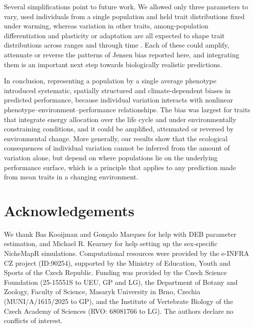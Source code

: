 \documentclass[12pt]{article}
\begin{document}
Several simplifications point to future work. We allowed only three parameters to vary, used individuals from a single population and held trait distributions fixed under warming, whereas variation in other traits, among-population differentiation and plasticity or adaptation are all expected to shape trait distributions across ranges and through time \parencite{moran2016,sexton2009,chevin2010,kingsolver2017}. Each of these could amplify, attenuate or reverse the patterns of Jensen bias reported here, and integrating them is an important next step towards biologically realistic predictions.

In conclusion, representing a population by a single average phenotype introduced systematic, spatially structured and climate-dependent biases in predicted performance, because individual variation interacts with nonlinear phenotype--environment--performance relationships. The bias was largest for traits that integrate energy allocation over the life cycle and under environmentally constraining conditions, and it could be amplified, attenuated or reversed by environmental change. More generally, our results show that the ecological consequences of individual variation cannot be inferred from the amount of variation alone, but depend on where populations lie on the underlying performance surface, which is a principle that applies to any prediction made from mean traits in a changing environment.

\section*{Acknowledgements}

We thank Bas Kooijman and Gonçalo Marques for help with DEB parameter estimation, and Michael R. Kearney for help setting up the sex-specific NicheMapR simulations. Computational resources were provided by the e-INFRA CZ project (ID:90254), supported by the Ministry of Education, Youth and Sports of the Czech Republic. Funding was provided by the Czech Science Foundation (25-15551S to UEU, GP and LG), the Department of Botany and Zoology, Faculty of Science, Masaryk University in Brno, Czechia (MUNI/A/1615/2025 to GP), and the Institute of Vertebrate Biology of the Czech Academy of Sciences (RVO: 68081766 to LG). The authors declare no conflicts of interest.

\printbibliography[heading=bibnumbered, title={References}]

\clearpage
\nolinenumbers
\end{document}
